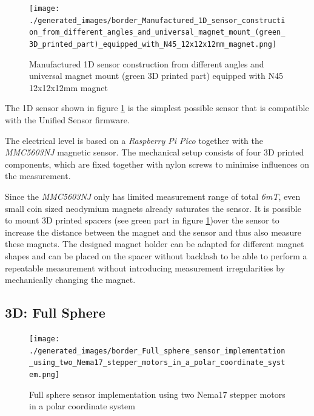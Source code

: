 \begin{figure}
\centering
\texttt{[image: ./generated\_images/border\_Manufactured\_1D\_sensor\_construction\_from\_different\_angles\_and\_universal\_magnet\_mount\_(green\_3D\_printed\_part)\_equipped\_with\_N45\_12x12x12mm\_magnet.png]}
\caption{Manufactured 1D sensor construction from different angles and
universal magnet mount (green 3D printed part) equipped with N45
12x12x12mm magnet
\label{Manufactured_1D_sensor_construction_from_different_angles_and_universal_magnet_mount_(green_3D_printed_part)_equipped_with_N45_12x12x12mm_magnet.png}}
\end{figure}

The 1D sensor shown in figure
\ref{Manufactured_1D_sensor_construction_from_different_angles_and_universal_magnet_mount_(green_3D_printed_part)_equipped_with_N45_12x12x12mm_magnet.png}
is the simplest possible sensor that is compatible with the Unified
Sensor firmware.

The electrical level is based on a \emph{Raspberry Pi Pico} together
with the \emph{MMC5603NJ} magnetic sensor. The mechanical setup consists
of four 3D printed components, which are fixed together with nylon
screws to minimise influences on the measurement.

\newpage

Since the \emph{MMC5603NJ} only has limited measurement range of total
\emph{6mT}, even small coin sized neodymium magnets already saturates
the sensor. It is possible to mount 3D printed spacers (see green part
in figure
\ref{Manufactured_1D_sensor_construction_from_different_angles_and_universal_magnet_mount_(green_3D_printed_part)_equipped_with_N45_12x12x12mm_magnet.png})over
the sensor to increase the distance between the magnet and the sensor
and thus also measure these magnets. The designed magnet holder can be
adapted for different magnet shapes and can be placed on the spacer
without backlash to be able to perform a repeatable measurement without
introducing measurement irregularities by mechanically changing the
magnet.

\hypertarget{d-full-sphere}{%
\subsection{3D: Full Sphere}\label{d-full-sphere}}

\begin{figure}
\centering
\texttt{[image: ./generated\_images/border\_Full\_sphere\_sensor\_implementation\_using\_two\_Nema17\_stepper\_motors\_in\_a\_polar\_coordinate\_system.png]}
\caption{Full sphere sensor implementation using two Nema17 stepper
motors in a polar coordinate system
\label{Full_sphere_sensor_implementation_using_two_Nema17_stepper_motors_in_a_polar_coordinate_system.png}}
\end{figure}

